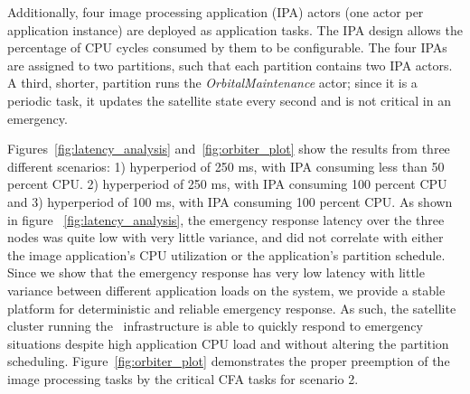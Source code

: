  Additionally, four image processing application (IPA) actors (one
 actor per application instance) are deployed as application
 tasks. The IPA design allows the percentage of CPU cycles consumed by
 them to be configurable.  The four IPAs are  
 assigned to two partitions, such that each partition contains two IPA
 actors.  A third, shorter, partition runs the
 \emph{OrbitalMaintenance} actor; since it is a periodic task, it
 updates the satellite state every second and is not critical in an
 emergency.   


\iffalse
To ensure the cluster safety, the latency between the reception of the command from the ground station and the activation of the satellites' thrusters should be minimized, \emph{i.e.} regardless of other applications, the latency of the interaction 
between the \textit{CommandProxy} and the \textit{ModuleProxy}
should remain as small as possible.  Note: since only the cluster leader (node \emph{1}) receives the scatter command, \emph{CommandProxy} and command publish on nodes \emph{2} and \emph{3} are not active.   
These latencies were calculated from time-stamped messages; using NTP (\url{http://www.ntp.org}), all nodes' clocks were synchronized. %
\fi
Figures~\ref{fig:latency_analysis} and~\ref{fig:orbiter_plot} show the results from three different scenarios: 1) hyperperiod of 250 ms, with IPA consuming less than 50 percent CPU. 2)  hyperperiod of 250 ms, with IPA consuming 100 percent CPU and 3)  hyperperiod of 100 ms, with IPA consuming 100 percent CPU. As shown in figure ~\ref{fig:latency_analysis}, the emergency response latency over the three nodes was quite low with very little variance, and did not correlate with either the image application's CPU utilization or the application's partition schedule.  Since we show that the emergency response has very low latency with little variance between different application loads on the system, we provide a stable platform for deterministic and reliable emergency response.  As such, the satellite cluster running the \iap\ infrastructure is able to quickly respond to emergency situations despite high application CPU load and without altering the partition scheduling.  Figure~\ref{fig:orbiter_plot}  demonstrates the proper preemption of the image processing tasks by the critical CFA tasks for scenario 2.
